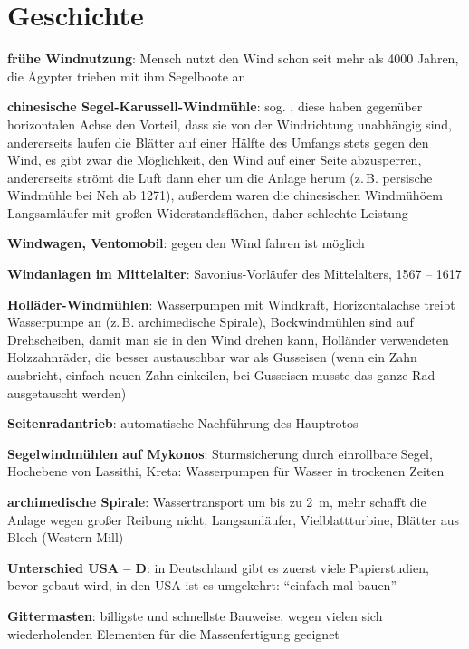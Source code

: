 \chapter{%
    Geschichte%
}

\textbf{frühe Windnutzung}:
Mensch nutzt den Wind schon seit mehr als 4000 Jahren,
die Ägypter trieben mit ihm Segelboote an

\textbf{chinesische Segel-Karussell-Windmühle}:
sog. ,
diese haben gegenüber horizontalen Achse den Vorteil, dass sie von der Windrichtung unabhängig
sind,
andererseits laufen die Blätter auf einer Hälfte des Umfangs stets gegen den Wind,
es gibt zwar die Möglichkeit, den Wind auf einer Seite abzusperren,
andererseits strömt die Luft dann eher um die Anlage herum
(z.\,B. persische Windmühle bei Neh ab 1271),
außerdem waren die chinesischen Windmühöem Langsamläufer mit großen Widerstandsflächen,
daher schlechte Leistung

\textbf{Windwagen, Ventomobil}:
gegen den Wind fahren ist möglich

\textbf{Windanlagen im Mittelalter}:
Savonius-Vorläufer des Mittelalters, 1567 -- 1617

\textbf{Holläder-Windmühlen}:
Wasserpumpen mit Windkraft,
Horizontalachse treibt Wasserpumpe an (z.\,B. archimedische Spirale),
Bockwindmühlen sind auf Drehscheiben, damit man sie in den Wind drehen kann,
Holländer verwendeten Holzzahnräder, die besser austauschbar war als Gusseisen
(wenn ein Zahn ausbricht, einfach neuen Zahn einkeilen, bei Gusseisen musste das ganze
Rad ausgetauscht werden)

\textbf{Seitenradantrieb}:
automatische Nachführung des Hauptrotos

\textbf{Segelwindmühlen auf Mykonos}:
Sturmsicherung durch einrollbare Segel,
Hochebene von Lassithi, Kreta:
Wasserpumpen für Wasser in trockenen Zeiten

\linie

\textbf{archimedische Spirale}:
Wassertransport um bis zu \SI{2}{\meter},
mehr schafft die Anlage wegen großer Reibung nicht,
Langsamläufer,
Vielblattturbine,
Blätter aus Blech
(Western Mill)

\textbf{Unterschied USA -- D}:
in Deutschland gibt es zuerst viele Papierstudien, bevor gebaut wird,
in den USA ist es umgekehrt: "`einfach mal bauen"'

\textbf{Gittermasten}:
billigste und schnellste Bauweise,
wegen vielen sich wiederholenden Elementen für die Massenfertigung geeignet

